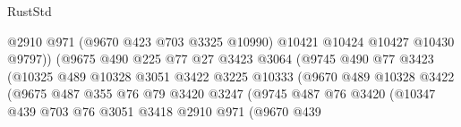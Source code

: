 \begin{lexlean}{RustStd}
\begin{coremodule}
                                          @2910
                                          @971
                                          (@9670 @423 @703 @3325 @10990)
                                          @10421
                                          @10424
                                          @10427
                                          @10430
                                          @9797))
                                      (@9675
                                        @490
                                        @225
                                        @77
                                        @27
                                        @3423
                                        @3064
                                        (@9745
                                          @490
                                          @77
                                          @3423
                                          (@10325
                                            @489
                                            @10328
                                            @3051
                                            @3422
                                            @3225
                                            @10333
                                            (@9670
                                              @489
                                              @10328
                                              @3422
                                              (@9675
                                                @487
                                                @355
                                                @76
                                                @79
                                                @3420
                                                @3247
                                                (@9745
                                                  @487
                                                  @76
                                                  @3420
                                                  (@10347
                                                    @439
                                                    @703
                                                    @76
                                                    @3051
                                                    @3418
                                                    @2910
                                                    @971
                                                    (@9670
                                                      @439

\end{coremodule}
\end{lexlean}
